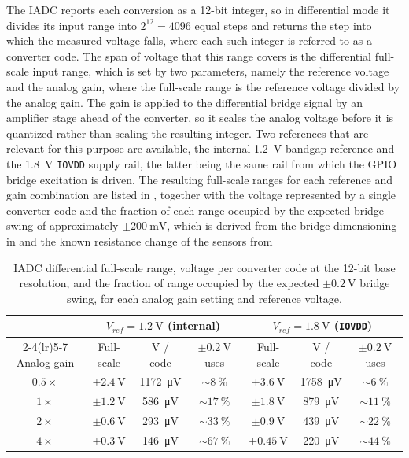 The IADC reports each conversion as a 12-bit integer, so in differential mode it divides its input range into $2^{12}=4096$ equal steps and returns the step into which the measured voltage falls, where each such integer is referred to as a converter code. 
The span of voltage that this range covers is the differential full-scale input range, which is set by two parameters, namely the reference voltage and the analog gain, where the full-scale range is the reference voltage divided by the analog gain.
The gain is applied to the differential bridge signal by an amplifier stage ahead of the converter, so it scales the analog voltage before it is quantized rather than scaling the resulting integer.
Two references that are relevant for this purpose are available, the internal \SI{1.2}{\volt} bandgap reference and the \SI{1.8}{\volt} \texttt{IOVDD} supply rail, the latter being the same rail from which the GPIO bridge excitation is driven.
The resulting full-scale ranges for each reference and gain combination are listed in , together with the voltage represented by a single converter code and the fraction of each range occupied by the expected bridge swing of approximately $\pm\SI{200}{\milli\volt}$, which is derived from the bridge dimensioning in  and the known resistance change of the sensors from 

\begin{table}
\centering
\small
\setlength{\tabcolsep}{4pt}
\caption{IADC differential full-scale range, voltage per converter code at the 12-bit base resolution, and the fraction of range occupied by the expected $\pm\SI{0.2}{\volt}$ bridge swing, for each analog gain setting and reference voltage.}
\label{tab:iadc_gain}
\begin{tabular}{ccccccc}
\hline
 & \multicolumn{3}{c}{$V_{\mathit{ref}}=\SI{1.2}{\volt}$ (internal)} & \multicolumn{3}{c}{$V_{\mathit{ref}}=\SI{1.8}{\volt}$ (\texttt{IOVDD})} \\
\cmidrule(lr){2-4}\cmidrule(lr){5-7}
Analog gain & Full-scale & V / code & $\pm\SI{0.2}{\volt}$ uses & Full-scale & V / code & $\pm\SI{0.2}{\volt}$ uses \\
\hline
$\num{0.5}\times$ & $\pm\SI{2.4}{\volt}$  & \SI{1172}{\micro\volt} & $\sim\SI{8}{\percent}$  & $\pm\SI{3.6}{\volt}$  & \SI{1758}{\micro\volt} & $\sim\SI{6}{\percent}$ \\
$\num{1}\times$   & $\pm\SI{1.2}{\volt}$  & \SI{586}{\micro\volt}  & $\sim\SI{17}{\percent}$ & $\pm\SI{1.8}{\volt}$  & \SI{879}{\micro\volt}  & $\sim\SI{11}{\percent}$ \\
$\num{2}\times$   & $\pm\SI{0.6}{\volt}$  & \SI{293}{\micro\volt}  & $\sim\SI{33}{\percent}$ & $\pm\SI{0.9}{\volt}$  & \SI{439}{\micro\volt}  & $\sim\SI{22}{\percent}$ \\
$\num{4}\times$   & $\pm\SI{0.3}{\volt}$  & \SI{146}{\micro\volt}  & $\sim\SI{67}{\percent}$ & $\pm\SI{0.45}{\volt}$ & \SI{220}{\micro\volt}  & $\sim\SI{44}{\percent}$ \\
\hline
\end{tabular}
\end{table}

